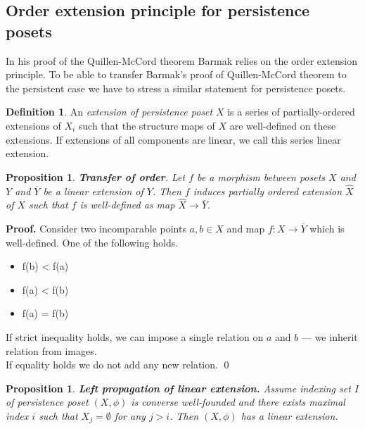 \documentclass[english,12pt]{article}
\newcounter{stmcounter}[section]
\numberwithin{equation}{section}
\newtheorem{proposition}[stmcounter]{Proposition}
\theoremstyle{definition}
\newtheorem{definition}[stmcounter]{Definition}
\theoremstyle{remark}
\newenvironment{pf}{\noindent\textbf{Proof.}}{\qed}
\newcommand{\define}[1]{{\textit{#1}}}
\begin{document}
\subsection{Order extension principle for persistence posets}

In his proof of the Quillen-McCord theorem Barmak relies on the order extension principle. To be able to transfer Barmak's proof of Quillen-McCord theorem to the persistent case we have to stress a similar statement for persistence posets.

\begin{definition}
  An \define{extension of persistence poset} $X$ is a series of partially-ordered extensions of $X_i$ such that the structure maps of $X$ are well-defined on these extensions. If extensions of all components are linear, we call this series linear extension.
\end{definition}

\begin{proposition}
  \textbf{Transfer of order}. Let $f$ be a morphism between posets $X$ and $Y$ and $\overline{Y}$ be a linear extension of $Y$. Then $f$ induces partially ordered extension $\hat{X}$ of $X$ such that $f$ is well-defined as map $\hat{X} \to \overline{Y}$.
\end{proposition}

\begin{pf}
  Consider two incomparable points $a, b \in X$ and map $f : X \to \overline{Y}$ which is well-defined. One of the following holds.\\
  \begin{itemize}
    \item f(b) < f(a)
    \item f(a) < f(b)
    \item f(a) = f(b)
  \end{itemize}
  If strict inequality holds, we can impose a single relation on $a$ and $b$ --- we inherit relation from images.\\
  If equality holds we do not add any new relation.
\end{pf}

\begin{proposition}
  \textbf{Left propagation of linear extension.} Assume indexing set $I$ of persistence poset $(X,\phi)$ is converse well-founded and there exists maximal index $i$ such that $X_j = \emptyset$ for any $j > i$. Then $(X,\phi)$ has a linear extension.
\end{proposition}
\end{document}
